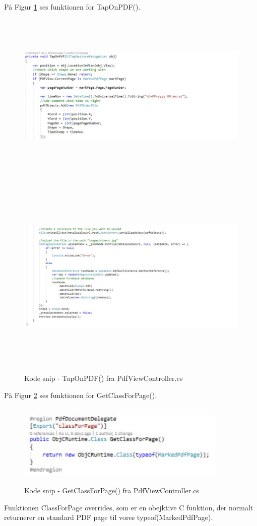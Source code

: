 På Figur \ref{fig:TapOnPDF2} ses funktionen for TapOnPDF().
\begin{figure}[H] %
	\centering
	\includegraphics[height=8cm, width=15cm]{../ArkitekturDesign/Design/RegisterPDF/TapOnPDF1}
\end{figure}
\begin{figure}[H] %
	\centering
	\includegraphics[height=10cm, width=17cm]{../ArkitekturDesign/Design/RegisterPDF/TapOnPDF2}
	\caption{Kode snip - TapOnPDF() fra PdfViewController.cs}
	\label{fig:TapOnPDF2}
\end{figure}


\clearpage

På Figur \ref{fig:ClassPage} ses funktionen for GetClassForPage().
\begin{figure}[H] %
	\centering
	\includegraphics[height=4cm, width=10cm]{../ArkitekturDesign/Design/RegisterPDF/ClassPage}
	\caption{Kode snip - GetClassForPage() fra PdfViewController.cs}
	\label{fig:ClassPage}
\end{figure}
Funktionen ClassForPage overrides, som er en obejktive C funktion, der normalt returnerer en standard PDF page til vores typeof(MarkedPdfPage).

